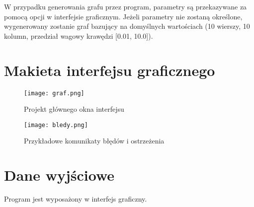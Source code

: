 \documentclass[]{article}
\begin{document}
W przypadku generowania grafu przez program, parametry są przekazywane za pomocą opcji w interfejsie graficznym. Jeżeli parametry nie zostaną określone, wygenerowany zostanie graf bazujący na domyślnych wartościach (10 wierszy, 10 kolumn, przedział wagowy krawędzi [0.01, 10.0]).
\newpage
\section{Makieta interfejsu graficznego}\label{header-n233}
\begin{figure}[h!]
\begin{center}
  \texttt{[image: graf.png]}
  \end{center}
  \caption{Projekt głównego okna interfejsu}
  \label{fig:graf}
\end{figure}
\begin{figure}[h!]
\begin{center}
  \texttt{[image: bledy.png]}
  \end{center}
  \caption{Przykładowe komunikaty błędów i ostrzeżenia}
  \label{fig:bledy}
\end{figure}


\section{Dane wyjściowe}\label{header-n279}
Program jest wyposażony w interfejs graficzny.
\end{document}
